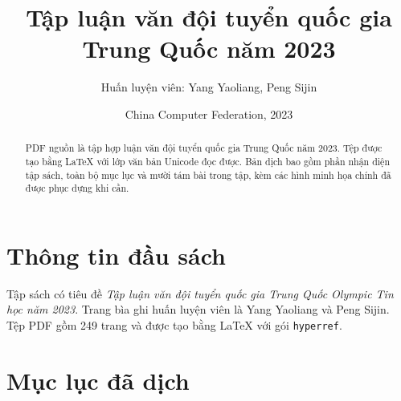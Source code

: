 \documentclass[11pt]{article}
\title{Tập luận văn đội tuyển quốc gia Trung Quốc năm 2023}
\author{Huấn luyện viên: Yang Yaoliang, Peng Sijin}
\date{China Computer Federation, 2023}
\begin{document}
\maketitle


\renewcommand{\abstractname}{Tóm tắt}
\renewcommand{\figurename}{Hình}
\begin{abstract}
PDF nguồn là tập hợp luận văn đội tuyển quốc gia Trung Quốc năm 2023. Tệp được
tạo bằng LaTeX với lớp văn bản Unicode đọc được. Bản dịch bao gồm phần nhận
diện tập sách, toàn bộ mục lục và mười tám bài trong tập, kèm các
hình minh họa chính đã được phục dựng khi cần.
\end{abstract}

\section{Thông tin đầu sách}

Tập sách có tiêu đề \emph{Tập luận văn đội tuyển quốc gia Trung Quốc Olympic
Tin học năm 2023}. Trang bìa ghi huấn luyện viên là Yang Yaoliang và Peng
Sijin. Tệp PDF gồm 249 trang và được tạo bằng LaTeX với gói \texttt{hyperref}.

\section{Mục lục đã dịch}
\end{document}
